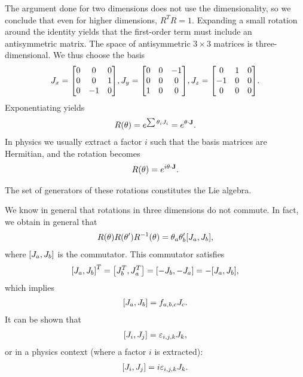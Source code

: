 The argument done for two dimensions does not use the dimensionality, so we conclude that even for higher dimensions, $R^{T}R = 1$. Expanding a small rotation around the identity yields that the first-order term must include an antisymmetric matrix. The space of antisymmetric $3\times 3$ matrices is three-dimensional. We thus choose the basis
\begin{align*}
J_{x} =
\mqty[
0 & 0  & 0 \\
0 & 0  & 1 \\
0 & -1 & 0
],
J_{y} =
\mqty[
0 & 0 & -1 \\
0 & 0 & 0  \\
1 & 0 & 0
],
J_{z} =
\mqty[
0  & 1 & 0 \\
-1 & 0 & 0 \\
0  & 0 & 0
].
\end{align*}
Exponentiating yields
\begin{align*}
R(\theta) = e^{\sum \theta_{i}J_{i}} = e^{\vb{\theta}\cdot\vb{J}}.
\end{align*}
In physics we usually extract a factor $i$ such that the basis matrices are Hermitian, and the rotation becomes
\begin{align*}
R(\theta) = e^{i\vb{\theta}\cdot\vb{J}}.
\end{align*}

The set of generators of these rotations constitutes the Lie algebra.

We know in general that rotations in three dimensions do not commute. In fact, we obtain in general that
\begin{align*}
R(\vb{\theta})R(\vb{\theta}')R^{-1}(\vb{\theta}) = \theta_{a}\theta_{b}'\comm{J_{a}}{J_{b}},
\end{align*}
where $\comm{J_{a}}{J_{b}}$ is the commutator. This commutator satisfies
\begin{align*}
\comm{J_{a}}{J_{b}}^{T} = \comm{J_{b}^{T}}{J_{a}^{T}} = \comm{-J_{b}}{-J_{a}} = -\comm{J_{a}}{J_{b}},
\end{align*}
which implies
\begin{align*}
\comm{J_{a}}{J_{b}} = f_{a,b,c}J_{c}.
\end{align*}
It can be shown that
\begin{align*}
\comm{J_{i}}{J_{j}} = \varepsilon_{i,j,k}J_{k},
\end{align*}
or in a physics context (where a factor $i$ is extracted):
\begin{align*}
\comm{J_{i}}{J_{j}} = i\varepsilon_{i,j,k}J_{k}.
\end{align*}